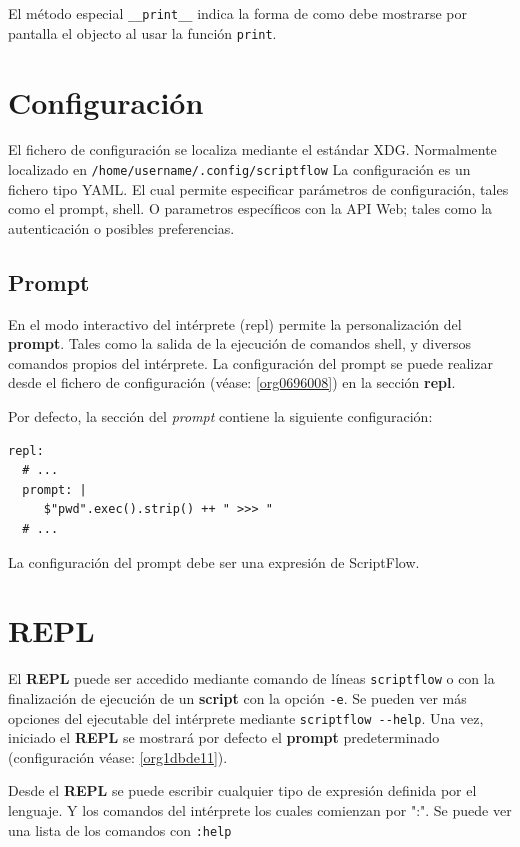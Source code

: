 \documentclass[11pt]{article}
\begin{document}
El método especial \texttt{\_\_print\_\_} indica la forma de como debe mostrarse por pantalla el objecto al usar la función \texttt{print}.


\section{Configuración}
\label{sec:org85e6880}

\label{org0696008}
El fichero de configuración se localiza mediante el
estándar XDG. Normalmente localizado en \texttt{/home/username/.config/scriptflow}
La configuración es un fichero tipo YAML. El cual permite especificar
parámetros de configuración, tales como el prompt, shell. O parametros
específicos con la API Web; tales como la autenticación o posibles
preferencias.

\subsection{Prompt}
\label{sec:org50df81a}

\label{org1dbde11}
En el modo interactivo del intérprete (repl) permite la personalización del
\textbf{prompt}. Tales como la salida de la ejecución de comandos
shell, y diversos comandos propios del intérprete. La configuración del
prompt se puede realizar desde el fichero de configuración (véase:
\ref{org0696008}) en la sección \textbf{repl}.

Por defecto, la sección del \emph{prompt} contiene la siguiente configuración:

\begin{verbatim}
repl:
  # ...
  prompt: |
     $"pwd".exec().strip() ++ " >>> "
  # ...
\end{verbatim}

La configuración del prompt debe ser una expresión de ScriptFlow.

\section{REPL}
\label{sec:org7b2643e}
El \textbf{REPL} puede ser accedido mediante comando de líneas \texttt{scriptflow} o con la
finalización de ejecución de un \textbf{script} con la opción \texttt{-e}. Se pueden ver más opciones del
ejecutable del intérprete mediante \texttt{scriptflow -{}-help}. Una vez,
iniciado el \textbf{REPL} se mostrará por defecto el \textbf{prompt} predeterminado
(configuración véase: \ref{org1dbde11}).

Desde el \textbf{REPL} se puede escribir cualquier tipo de expresión definida por el
lenguaje. Y los comandos del intérprete los cuales comienzan por ":". Se
puede ver una lista de los comandos con \texttt{:help}
\end{document}

